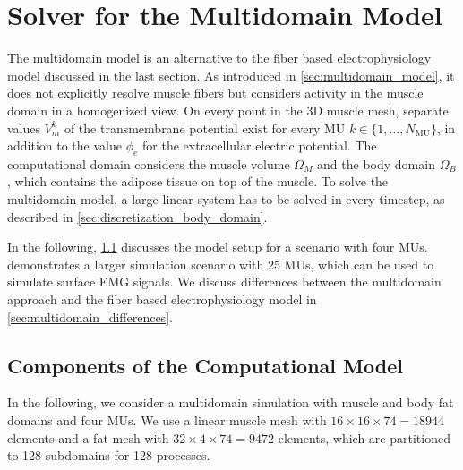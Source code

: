 

\iffalse

\section{Solver for the Multidomain Model}\label{sec:solver_multidomain_model}

The multidomain model is an alternative to the fiber based electrophysiology model discussed in the last section.
As introduced in \cref{sec:multidomain_model}, it does not explicitly resolve muscle fibers but considers activity in the muscle domain in a homogenized view.
On every point in the 3D muscle mesh, separate values $V_m^k$ of the transmembrane potential exist for every MU $k \in \{1,\dots,N_\text{MU}\}$, in addition to the value $\phi_e$ for the extracellular electric potential. 
The computational domain considers the muscle volume $\Omega_M$ and the body domain $\Omega_B$, which contains the adipose tissue on top of the muscle.
To solve the multidomain model, a large linear system has to be solved in every timestep, as described in \cref{sec:discretization_body_domain}.

In the following, \cref{sec:multidomain_components} discusses the model setup for a scenario with four MUs.  demonstrates a larger simulation scenario with 25 MUs, which can be used to simulate surface EMG signals. We discuss differences between the multidomain approach and the fiber based electrophysiology model in \cref{sec:multidomain_differences}.

\subsection{Components of the Computational Model}\label{sec:multidomain_components}

In the following, we consider a multidomain simulation with muscle and body fat domains and four MUs. We use a linear muscle mesh with $16 \times 16 \times 74 = \num{18944}$ elements and a fat mesh with $32 \times 4 \times 74 = \num{9472}$ elements, which are partitioned to 128 subdomains for 128 processes. 

